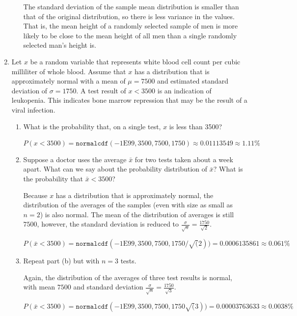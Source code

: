 \documentclass{article}
\newcommand{\answer}[1]{\color{red}#1}
\begin{document}
\begin{enumerate}
\begin{enumerate}
	{\answer The standard deviation of the sample mean distribution is smaller than that of the original distribution, so there is less variance in the values.  That is, the mean height of a randomly selected sample of men is more likely to be close to the mean height of all men than a single randomly selected man's height is.
	} 
	\end{enumerate}

	
\item Let $x$ be a random variable that represents white blood cell count per cubic milliliter of whole blood.  Assume that $x$ has a distribution that is approximately normal with a mean of $\mu = 7500$ and estimated standard deviation of $\sigma = 1750$.  A test result of $x<3500$ is an indication of leukopenia.  This indicates bone marrow repression that may be the result of a viral infection.

	\begin{enumerate}
	
	\item What is the probability that, on a single test, $x$ is less than 3500? 
	
	{\answer $P(x<3500) = \texttt{normalcdf}(-1\mbox{E}99, 3500, 7500, 1750) \approx 0.01113549 \approx 1.11\%$
	} 

	\item Suppose a doctor uses the average $\bar x$ for two tests taken about a week apart.  What can we say about the probability distribution of $\bar x$?  What is the probability that $\bar x < 3500$? 
	
	{\answer Because $x$ has a distribution that is approximately normal, the distribution of the averages of the samples (even with size as small as $n=2$) is also normal.  The mean of the distribution of averages is still $7500$, however, the standard deviation is reduced to $\frac{\sigma}{\sqrt{n}} = \frac{1750}{\sqrt{2}}.$ 
	
	$P(\bar{x} < 3500) = \texttt{normalcdf}(-1\mbox{E}99, 3500, 7500, 1750/\sqrt(2)) = 0.0006135861 \approx 0.061\%$
	} 

	\item Repeat part (b) but with $n=3$ tests. 
	
	{\answer Again, the distribution of the averages of three test results is normal, with mean $7500$ and standard deviation $\frac{\sigma}{\sqrt{n}} = \frac{1750}{\sqrt{3}}$. 
	
	$P(\bar{x} < 3500) = \texttt{normalcdf}(-1\mbox{E}99, 3500, 7500, 1750\sqrt(3)) = 0.00003763633 \approx 0.0038\%$
	} 


\end{enumerate}
\end{enumerate}
\end{document}
